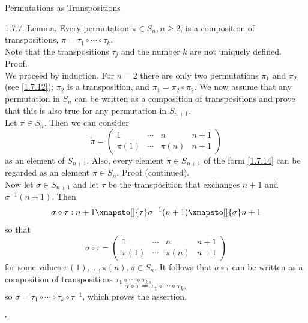 \documentclass[smaller,hyperref={CJKbookmarks=true}]{beamer}
\begin{document}
\begin{frame}{Permutations as Transpositions}
\begin{spacing}{1}
\alert{1.7.7. Lemma.} Every permutation $\pi\in S_n,n\geq2$, is a composition of transpositions, $\pi=\tau_1\circ\cdots\circ\tau_k$.\\[6pt]
Note that the transpositions $\tau_j$ and the number $k$ are \textcolor[rgb]{1.00,0.00,0.00}{not} uniquely defined.\\[5pt]
\alert{Proof.}\\
We proceed by induction. For $n=2$ there are only two permutations $\pi_1$ and $\pi_2$ (see \eqref{1.7.12}); $\pi_2$ is a transposition, and $\pi_1=\pi_2\circ\pi_2$. We now assume that any permutation in $S_n$ can be written as a composition of transpositions and prove that this is also true for any permutation in $S_{n+1}$.\\[7pt]
Let $\pi\in S_n$. Then we can consider
\begin{equation}\label{1.7.14}
  \widetilde{\pi}=\begin{pmatrix}
                    1 & \cdots & n & n+1 \\
                    \pi(1) & \cdots & \pi(n)& n+1
                  \end{pmatrix}
\end{equation}
as an element of $S_{n+1}$. Also, every element $\widetilde{\pi}\in S_{n+1}$ of the form \eqref{1.7.14} can be regarded as an element $\pi\in S_n$.
\newpage
\alert{Proof (continued).}\\
Now let $\sigma\in S_{n+1}$ and let $\tau$ be the transposition that exchanges $n+1$ and $\sigma^{-1}(n+1)$. Then
\[\sigma\circ\tau:n+1\xmapsto[]{\tau}\sigma^{-1}(n+1)\xmapsto[]{\sigma}n+1\]
so that
\[\sigma\circ\tau=\begin{pmatrix}
                    1 & \cdots & n & n+1 \\
                    \pi(1) & \cdots & \pi(n) & n+1
                  \end{pmatrix}\]
for some values $\pi(1),\ldots,\pi(n),\pi\in S_n$. It follows that $\sigma\circ\tau$ can be written as a composition of transpositions $\tau_1\circ\cdots\circ\tau_k$,
\[\sigma\circ\tau=\tau_1\circ\cdots\circ\tau_k,\]
so $\sigma=\tau_1\circ\cdots\circ\tau_k\circ\tau^{-1}$, which proves the assertion.
\begin{flushright}
  $\square$
\end{flushright}
\end{spacing}
\end{frame}
\end{document}
